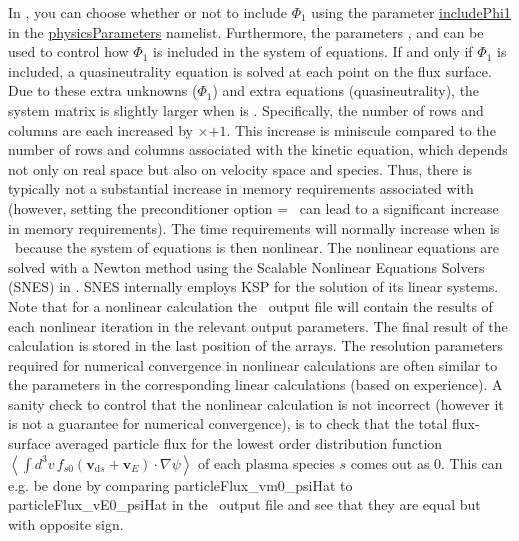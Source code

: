 In \sfincs, you can choose whether or not to
include $\Phi_1$ using the parameter {\ttfamily \hyperlink{includePhi1}{includePhi1}} in the 
{\ttfamily \hyperref[sec:physicsParameters]{physicsParameters}}
namelist. 
Furthermore, the parameters ,  and  can be used to control how $\Phi_1$ is included in the system of equations. 
If and only if $\Phi_1$ is included, a quasineutrality equation is solved
at each point on the flux surface.  Due to these extra unknowns ($\Phi_1$) and extra equations
(quasineutrality), the system matrix is slightly larger when  is \true.
Specifically, the number of rows and columns are each increased by \Ntheta$\times$\Nzeta$+1$.  This increase is miniscule compared
to the number of rows and columns associated with the kinetic equation, which depends not only on real space
but also on velocity space and species.  
Thus, there is typically not a substantial increase in memory requirements associated with  (however, setting the preconditioner option  = \false~can lead to a significant increase in memory requirements). 
The time requirements will normally increase when  is \true~because the system of equations is then nonlinear. 
The nonlinear equations are solved with a Newton method using the Scalable Nonlinear Equations Solvers (SNES) in \PETSc. SNES internally employs KSP for the solution of its linear systems. 
Note that for a nonlinear calculation the \sfincs~output file  will contain the results of each nonlinear iteration in the relevant output parameters. The final result of the calculation is stored in the last position of the arrays. 
The resolution parameters required for numerical convergence in nonlinear calculations are often similar to the parameters in the corresponding linear calculations (based on experience). 
A sanity check to control that the nonlinear calculation is not incorrect (however it is not a guarantee for numerical convergence), is to check that the total flux-surface averaged particle flux for the lowest order distribution function $\displaystyle \left\langle \int d^3 v \, f_{s0} \left(\bm{v}_{\mathrm{d} s} + \bm{v}_{E}\right) \cdot \nabla \psi \right\rangle$ of each plasma species $s$ comes out as 0. This can e.g. be done by comparing {\ttfamily particleFlux\_vm0\_psiHat} to {\ttfamily particleFlux\_vE0\_psiHat} in the \sfincs~output file  and see that they are equal but with opposite sign. 


